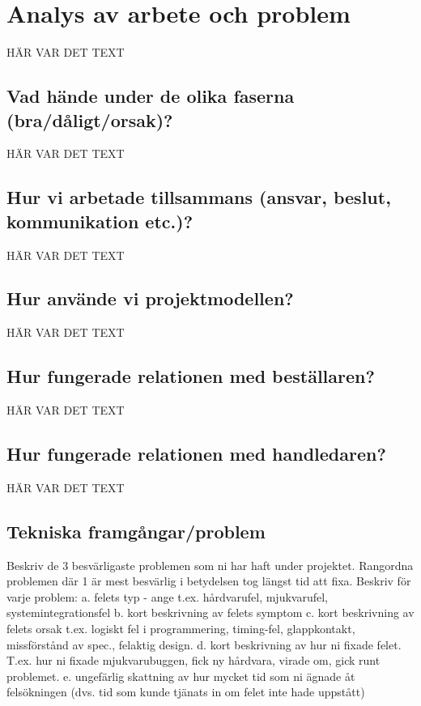 \documentclass[a4paper,titlepage,12pt]{article}
\begin{document}
	\section{Analys av arbete och problem}
	HÄR VAR DET TEXT
	
	\subsection{Vad hände under de olika faserna (bra/dåligt/orsak)?}
	HÄR VAR DET TEXT
	
	\subsection{Hur vi arbetade tillsammans (ansvar, beslut, kommunikation etc.)?}
	HÄR VAR DET TEXT
	
	\subsection{Hur använde vi projektmodellen?}
	HÄR VAR DET TEXT
	
	\subsection{Hur fungerade relationen med beställaren?}
	HÄR VAR DET TEXT
	
	\subsection{Hur fungerade relationen med handledaren?}
	HÄR VAR DET TEXT
	
	\subsection{Tekniska framgångar/problem}
	Beskriv de 3 besvärligaste problemen som ni har haft under projektet. 
	Rangordna problemen där 1 är mest besvärlig i betydelsen tog längst tid att fixa.
	Beskriv för varje problem:
	a. felets typ - ange t.ex.  hårdvarufel, mjukvarufel, systemintegrationsfel 
	b. kort beskrivning av felets symptom 
	c. kort beskrivning av felets orsak t.ex. logiskt fel i programmering, timing-fel, glappkontakt, missförstånd av spec., felaktig design. 
	d. kort beskrivning av hur ni fixade felet. T.ex. hur ni fixade mjukvarubuggen, fick ny hårdvara, virade om, gick runt problemet.
	e. ungefärlig skattning av hur mycket tid som ni ägnade åt felsökningen (dvs. tid som kunde tjänats in om felet inte hade uppstått)
	
\end{document}
